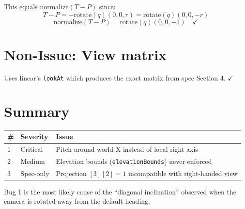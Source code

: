 \documentclass{article}
\begin{document}
This equals $\text{normalize}(T - P)$ since:
\[
T - P = -\text{rotate}(q)(0, 0, r) = \text{rotate}(q)(0, 0, -r)
\]
\[
\text{normalize}(T - P) = \text{rotate}(q)(0, 0, -1) \quad \checkmark
\]

\section{Non-Issue: View matrix}

Uses linear's \texttt{lookAt} which produces the exact matrix from spec
Section 4. $\checkmark$

\section{Summary}

\begin{table}[h]
\centering
\begin{tabular}{llp{5.5cm}}
\toprule
\textbf{\#} & \textbf{Severity} & \textbf{Issue} \\
\midrule
1 & Critical & Pitch around world-X instead of local right axis \\
2 & Medium & Elevation bounds (\texttt{elevationBounds}) never enforced \\
3 & Spec-only & Projection $[3][2]=1$ incompatible with right-handed view \\
\bottomrule
\end{tabular}
\end{table}

Bug 1 is the most likely cause of the ``diagonal inclination'' observed when
the camera is rotated away from the default heading.
\end{document}
